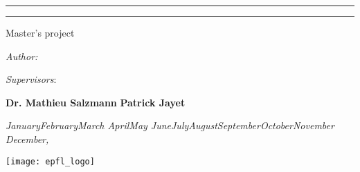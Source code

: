 \renewcommand{\today}{\ifcase \month \or January\or February\or March\or %
April\or May \or June\or July\or August\or September\or October\or November\or %
December\fi, \number \year}

\makeatletter
\begin{titlepage}
  \begin{center}
    \vspace*{2cm}

    \rule{.9\linewidth}{.6pt}
    {\huge \textbf{\@title}\par}
    \rule{.9\linewidth}{.6pt}

    {\large Master's project \par}
  \end{center}

  \vspace{7cm}
  \begin{minipage}[t]{.5\textwidth}
    \large
    \textit{Author:}

    \textbf{\@author}
  \end{minipage}
  \begin{minipage}[t]{.4\textwidth}
    \large
    \raggedleft
    \textit{Supervisors}:

    \textbf{Dr. Mathieu Salzmann}
    \textbf{Patrick Jayet}
  \end{minipage}

  \begin{center}
  \vspace{\fill}
  \textit{\today}
  \vspace{\fill}

  \texttt{[image: epfl\_logo]}
  \end{center}
\end{titlepage}
\makeatother
